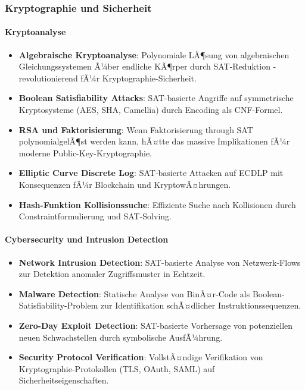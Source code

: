 ﻿\documentclass[a4paper,12pt]{article}
\theoremstyle{definition}
\begin{document}
\subsubsection{Kryptographie und Sicherheit}

\paragraph{Kryptoanalyse}

\begin{itemize}
	\item \textbf{Algebraische Kryptoanalyse}: Polynomiale LÃ¶sung von algebraischen Gleichungssystemen Ã¼ber endliche KÃ¶rper durch SAT-Reduktion - revolutionierend fÃ¼r Kryptogra\-phie-Sicherheit.
	
	\item \textbf{Boolean Satisfiability Attacks}: SAT-basierte Angriffe auf symmetrische Kryptosysteme (AES, SHA, Camellia) durch Encoding als CNF-Formel.
	
	\item \textbf{RSA und Faktorisierung}: Wenn Faktorisierung through SAT polynomialgelÃ¶st werden kann, hÃ¤tte das massive Implikationen fÃ¼r moderne Public-Key-Kryptographie.
	
	\item \textbf{Elliptic Curve Discrete Log}: SAT-basierte Attacken auf ECDLP mit Konsequenzen fÃ¼r Blockchain und KryptowÃ¤hrungen.
	
	\item \textbf{Hash-Funktion Kollisionssuche}: Effiziente Suche nach Kollisionen durch Constraintformulierung und SAT-Solving.
\end{itemize}

\paragraph{Cybersecurity und Intrusion Detection}

\begin{itemize}
	\item \textbf{Network Intrusion Detection}: SAT-basierte Analyse von Netzwerk-Flows zur Detektion anomaler Zugriffsmuster in Echtzeit.
	
	\item \textbf{Malware Detection}: Statische Analyse von BinÃ¤r-Code als Boolean-Satisfiability-Problem zur Identifikation schÃ¤dlicher Instruktionssequenzen.
	
	\item \textbf{Zero-Day Exploit Detection}: SAT-basierte Vorhersage von potenziellen neuen Schwachstellen durch symbolische AusfÃ¼hrung.
	
	\item \textbf{Security Protocol Verification}: VollstÃ¤ndige Verifikation von Kryptographie-Protokollen (TLS, OAuth, SAML) auf Sicherheitseigenschaften.
\end{itemize}
\end{document}
